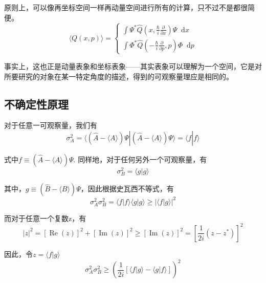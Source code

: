 \documentclass[UTF8]{ctexart}
\begin{document}
\noindent 原则上，可以像再坐标空间一样再动量空间进行所有的计算，只不过不是都很简便。
\begin{equation}
\langle Q(x, p)\rangle=\left\{\begin{array}{l}{\int \Psi^{*} \hat{Q}\left(x, \frac{\hbar}{i} \frac{\partial}{\partial x}\right) \Psi \mathop{}\!\mathrm{d}  x} \\ {\int \Phi^{*} \hat{Q}\left(-\frac{\hbar}{i} \frac{\partial}{\partial p}, p\right) \Phi \mathop{}\!\mathrm{d}  p}\end{array}\right.
\end{equation}

    事实上，这也正是动量表象和坐标表象——其实表象可以理解为一个空间，它是对所要研究的对象在某一特定角度的描述，得到的可观察量理应是相同的。

    \subsection{不确定性原理}
    对于任意一可观察量，我们有
    \begin{equation}
        \sigma^2_A = \langle (\hat{A} - \langle A \rangle) \Psi | (\hat{A}- \langle A \rangle )\Psi \rangle = \langle f | f \rangle
    \end{equation}

\noindent 式中$f \equiv (\hat{A} - \langle A \rangle ) \Psi$. 同样地，对于任何另外一个可观察量，有
\begin{equation}
    \sigma_B^2 = \langle g | g \rangle 
\end{equation}

\noindent 其中，$g \equiv (\hat{B} - \langle B \rangle ) \Psi$，因此根据史瓦西不等式，有
\begin{equation}
    \sigma_{A}^{2} \sigma_{B}^{2}=\langle f | f\rangle\langle g | g\rangle \geq|\langle f | g\rangle|^{2} \label{equ3.1}
    \end{equation}

    而对于任意一个复数z，有
    \begin{equation}
        |z|^{2}=[\operatorname{Re}(z)]^{2}+[\operatorname{Im}(z)]^{2} \geq[\operatorname{Im}(z)]^{2}=\left[\frac{1}{2 i}\left(z-z^{*}\right)\right]^{2}\label{equ3.2}
        \end{equation}

\noindent 因此，令$z = \langle f | g \rangle $
\begin{equation}
    \sigma_A^2 \sigma_B^2 \ge \left(\frac{1}{2i}\left[\langle f| g \rangle  - \langle g|f \rangle \right]\right)^2
\end{equation}
\end{document}
